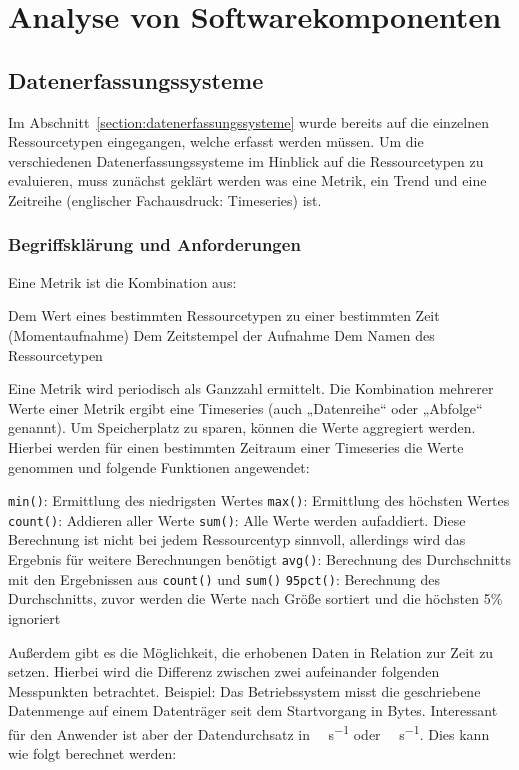 \chapter{Analyse von Softwarekomponenten}
\section{Datenerfassungssysteme}
Im Abschnitt~\ref{section:datenerfassungssysteme} wurde bereits auf die
einzelnen Ressourcetypen eingegangen, welche erfasst werden müssen. Um die
verschiedenen Datenerfassungssysteme im Hinblick auf die Ressourcetypen zu
evaluieren, muss zunächst geklärt werden was eine Metrik, ein Trend und eine
Zeitreihe (englischer Fachausdruck: Timeseries) ist.
\tm%

\subsection{Begriffsklärung und Anforderungen}
\label{section:Begriffserklärung}
Eine Metrik ist die Kombination aus:

\begin{outline}
  \1 Dem Wert eines bestimmten Ressourcetypen zu einer bestimmten Zeit
  (Momentaufnahme)
  \1 Dem Zeitstempel der Aufnahme
  \1 Dem Namen des Ressourcetypen
\end{outline}

Eine Metrik wird periodisch als Ganzzahl ermittelt. Die Kombination mehrerer
Werte einer Metrik ergibt eine Timeseries (auch „Datenreihe“ oder „Abfolge“
genannt). Um Speicherplatz zu sparen, können die Werte aggregiert werden.
Hierbei werden für einen bestimmten Zeitraum einer Timeseries die Werte
genommen und folgende Funktionen angewendet:

\begin{outline}
  \1 \lstinline|min()|: Ermittlung des niedrigsten Wertes
  \1 \lstinline|max()|: Ermittlung des höchsten Wertes
  \1 \lstinline|count()|: Addieren aller Werte
  \1 \lstinline|sum()|: Alle Werte werden aufaddiert. Diese Berechnung ist
  nicht bei jedem Ressourcentyp sinnvoll, allerdings wird das Ergebnis für
  weitere Berechnungen benötigt
  \1 \lstinline|avg()|: Berechnung des Durchschnitts mit den Ergebnissen aus
  \lstinline|count()| und \mbox{\lstinline|sum()|}
  \1 \lstinline|95pct()|: Berechnung des Durchschnitts, zuvor werden die Werte
  nach Größe sortiert und die höchsten 5\% ignoriert
\end{outline}

Außerdem gibt es die Möglichkeit, die erhobenen Daten in Relation zur Zeit zu
setzen. Hierbei wird die Differenz zwischen zwei aufeinander folgenden
Messpunkten betrachtet. Beispiel: Das Betriebssystem misst die geschriebene
Datenmenge auf einem Datenträger seit dem Startvorgang in Bytes. Interessant
für den Anwender ist aber der Datendurchsatz in \si{\mega\byte\per\second} oder
\si{\giga\byte\per\second}. Dies kann wie folgt berechnet werden:

